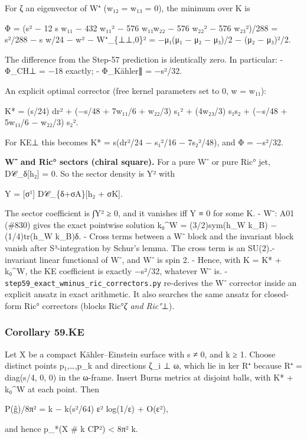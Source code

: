 \documentclass[
  10pt,
]{report}
\begin{document}
For ζ an eigenvector of W⁺ (w₁₂ = w₁₃ = 0), the minimum over K is

Φ = (s² − 12 s w₁₁ − 432 w₁₁² − 576 w₁₁w₂₂ − 576 w₂₂² − 576 w₂₃²)/288 =
s²/288 − s w/24 − w² − \textbar W⁺\_\{⊥⊥,0\}\textbar² = −μ₁(μ₁ − μ₂ −
μ₃)/2 − (μ₂ − μ₃)²/2.

The difference from the Step-57 prediction is identically zero. In
particular: - Φ\_CH⊥ = −18 exactly; - Φ\_Kähler∥ = −s²/32.

An explicit optimal corrector (free kernel parameters set to 0, w =
w₁₁):

K* = (s/24) dr² + (−s/48 + 7w₁₁/6 + w₂₂/3) s₁² + (4w₂₃/3) s₁s₂ + (−s/48
+ 5w₁₁/6 − w₂₂/3) s₂².

For KE⊥ this becomes K* = s(dr²/24 − s₁²/16 − 7s₂²/48), and Φ = −s²/32.

\textbf{W⁻ and Ric° sectors (chiral square).} For a pure W⁻ or pure Ric°
jet, D𝒞\_δ{[}h₂{]} = 0. So the sector density is \textbar Y\textbar²
with

Y = {[}σ¹{]} D𝒞\_\{δ+σA\}{[}h₂ + σK{]}.

The sector coefficient is ∫\textbar Y\textbar² ≥ 0, and it vanishes iff
Y ≡ 0 for some K. - W⁻: A01 (\#830) gives the exact pointwise solution
k₀\^{}W = (3/2)sym(h\_W k\_B) − (1/4)tr(h\_W k\_B)δ. - Cross terms
between a W⁻ block and the invariant block vanish after S³-integration
by Schur's lemma. The cross term is an SU(2)₋-invariant linear
functional of W⁻, and W⁻ is spin 2. - Hence, with K = K* + k₀\^{}W, the
KE coefficient is exactly −s²/32, whatever W⁻ is. -
\texttt{step59\_exact\_wminus\_ric\_correctors.py} re-derives the W⁻
corrector inside an explicit ansatz in exact arithmetic. It also
searches the same ansatz for closed-form Ric° correctors (blocks
Ric°\emph{ζ and Ric°}⊥).

\hypertarget{corollary-59.ke}{%
\subsubsection{Corollary 59.KE}\label{corollary-59.ke}}

Let X be a compact Kähler--Einstein surface with s ≠ 0, and k ≥ 1.
Choose distinct points p₁,\ldots,p\_k and directions ζ\_i ⊥ ω, which lie
in ker R⁺ because R⁺ = diag(s/4, 0, 0) in the ω-frame. Insert Burns
metrics at disjoint balls, with K* + k₀\^{}W at each point. Then

P(g̃)/8π² = k − k(s²/64) ε² log(1/ε) + O(ε²),

and hence p\_*(X \# k CP̄²) \textless{} 8π² k.
\end{document}
